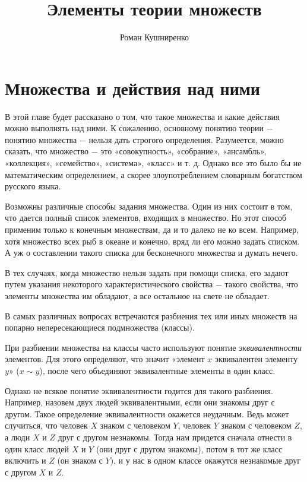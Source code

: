 \documentclass{article}
\title{Элементы теории множеств}
\author{Роман Кушниренко}
\begin{document}

	\maketitle

	\section{Множества и действия над ними}

В этой главе будет рассказано о том, что такое множества и какие действия можно выполнять над ними. К сожалению, основному понятию теории \(-\) понятию множества \(-\) нельзя дать строгого определения. Разумеется, можно сказать, что множество \(-\) это «совокупность», «собрание», «ансамбль», «коллекция», «семейство», «система», «класс» и т. д. Однако все это было бы не математическим определением, а скорее злоупотреблением словарным богатством русского языка. \newline

Возможны различные способы задания множества. Один из них состоит в том, что дается полный список элементов, входящих в множество. Но этот способ применим только к конечным множествам, да и то далеко не ко всем. Например, хотя множество всех рыб в океане и конечно, вряд ли его можно задать списком. А уж о составлении такого списка для бесконечного множества и думать нечего.

В тех случаях, когда множество нельзя задать при помощи списка, его задают путем указания некоторого характеристического свойства \(-\) такого свойства, что элементы множества им обладают, а все остальное на свете не обладает. \newline

В самых различных вопросах встречаются разбиения тех или иных множеств на попарно непересекающиеся подмножества (классы).

При разбиении множества на классы часто используют понятие \textit{эквивалентности} элементов. Для этого определяют, что значит «элемент \(x\) эквивалентен элементу \(y\)» (\(x \sim y\)), после чего объединяют эквивалентные элементы в один класс.

Однако не всякое понятие эквивалентности годится для такого разбиения. Например, назовем двух людей эквивалентными, если они знакомы друг с другом. Такое определение эквивалентности окажется неудачным. Ведь может случиться, что человек \(X\) знаком с человеком \(Y\), человек \(Y\) знаком с человеком \(Z\), а люди \(X\) и \(Z\) друг с другом незнакомы. Тогда нам придется сначала отнести в один класс людей \(X\) и \(Y\) (они друг с другом знакомы), потом в тот же класс включить и \(Z\) (он знаком с \(Y\)), и у нас в одном классе окажутся незнакомые друг с другом \(X\) и \(Z\).
\end{document}
